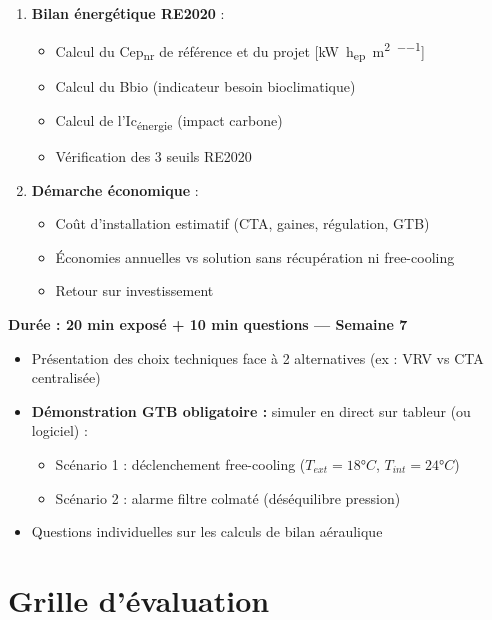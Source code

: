 \begin{methode}
\begin{enumerate}
  \item \textbf{Bilan énergétique RE2020} :
    \begin{itemize}
      \item Calcul du Cep\textsubscript{nr} de référence et du projet [\si{\kilo\watt\hour_{ep}\per\metre\squared\per\year}]
      \item Calcul du Bbio (indicateur besoin bioclimatique)
      \item Calcul de l'Ic\textsubscript{énergie} (impact carbone)
      \item Vérification des 3 seuils RE2020
    \end{itemize}

  \item \textbf{Démarche économique} :
    \begin{itemize}
      \item Coût d'installation estimatif (CTA, gaines, régulation, GTB)
      \item Économies annuelles vs solution sans récupération ni free-cooling
      \item Retour sur investissement
    \end{itemize}
\end{enumerate}
\end{methode}

\begin{methode}
\textbf{Durée : 20 min exposé + 10 min questions — Semaine 7}

\begin{itemize}
  \item Présentation des choix techniques face à 2 alternatives (ex : VRV vs CTA centralisée)
  \item \textbf{Démonstration GTB obligatoire :} simuler en direct sur tableur (ou logiciel) :
    \begin{itemize}
      \item Scénario 1 : déclenchement free-cooling ($T_{ext} = 18°C$, $T_{int} = 24°C$)
      \item Scénario 2 : alarme filtre colmaté (déséquilibre pression)
    \end{itemize}
  \item Questions individuelles sur les calculs de bilan aéraulique
\end{itemize}
\end{methode}

\section{Grille d'évaluation}


